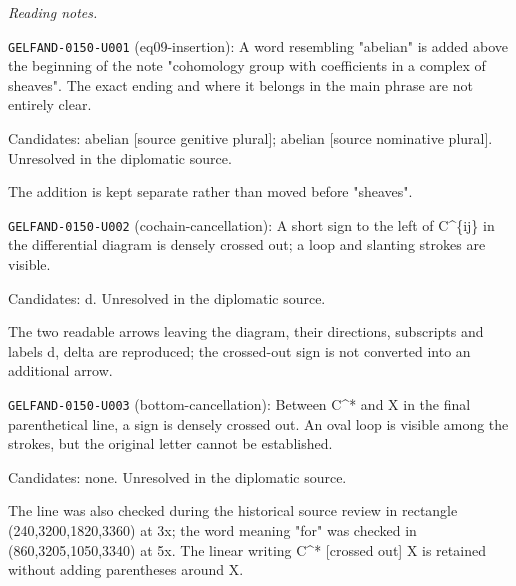 \par\smallskip\noindent\textit{Reading notes.}\par
\noindent\texttt{GELFAND-0150-U001} (eq09-insertion): A word resembling "abelian" is added above the beginning of the note "cohomology group with coefficients in a complex of sheaves". The exact ending and where it belongs in the main phrase are not entirely clear.\par
Candidates: abelian [source genitive plural]; abelian [source nominative plural]. Unresolved in the diplomatic source.\par
The addition is kept separate rather than moved before "sheaves".\par
\noindent\texttt{GELFAND-0150-U002} (cochain-cancellation): A short sign to the left of C\textasciicircum{}\{ij\} in the differential diagram is densely crossed out; a loop and slanting strokes are visible.\par
Candidates: d. Unresolved in the diplomatic source.\par
The two readable arrows leaving the diagram, their directions, subscripts and labels d, delta are reproduced; the crossed-out sign is not converted into an additional arrow.\par
\noindent\texttt{GELFAND-0150-U003} (bottom-cancellation): Between C\textasciicircum{}* and X in the final parenthetical line, a sign is densely crossed out. An oval loop is visible among the strokes, but the original letter cannot be established.\par
Candidates: none. Unresolved in the diplomatic source.\par
The line was also checked during the historical source review in rectangle (240,3200,1820,3360) at 3x; the word meaning "for" was checked in (860,3205,1050,3340) at 5x. The linear writing C\textasciicircum{}* [crossed out] X is retained without adding parentheses around X.\par


